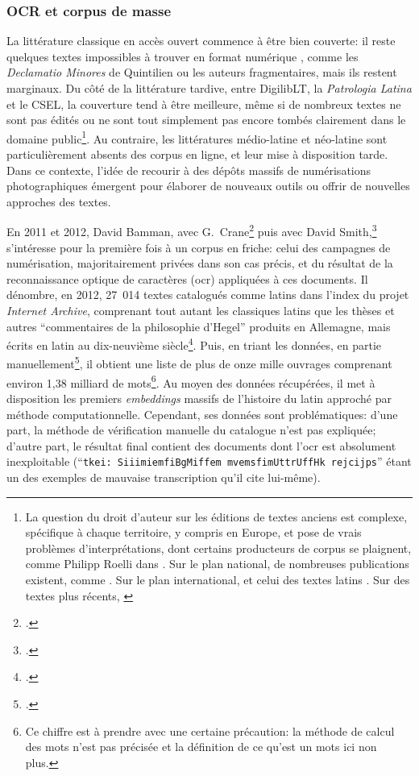 \subsubsection{OCR et corpus de masse}

La littérature classique en accès ouvert commence à être bien couverte: il reste quelques textes impossibles à trouver en format numérique , comme les \textit{Declamatio Minores} de Quintilien ou les auteurs fragmentaires, mais ils restent marginaux. Du côté de la littérature tardive, entre DigilibLT, la \textit{Patrologia Latina} et le CSEL, la couverture tend à être meilleure, même si de nombreux textes ne sont pas édités ou ne sont tout simplement pas encore tombés clairement dans le domaine public\footnote{La question du droit d'auteur sur les éditions de textes anciens est complexe, spécifique à chaque territoire, y compris en Europe, et pose de vrais problèmes d'interprétations, dont certains producteurs de corpus se plaignent, comme Philipp Roelli dans \cite{roelli2014corpus}. Sur le plan national, de nombreuses publications existent, comme \cite{combalbert_lediteur_2015, demonet_confiscation_2018}. Sur le plan international, et celui des textes latins \cite{fischer2017digital, dillen_digital_2016}. Sur des textes plus récents, \cite{dusollier_international_2019}}. Au contraire, les littératures médio-latine et néo-latine sont particulièrement absents des corpus en ligne, et leur mise à disposition tarde. Dans ce contexte, l'idée de recourir à des dépôts massifs de numérisations photographiques émergent pour élaborer de nouveaux outils ou offrir de nouvelles approches des textes.

En 2011 et 2012, David Bamman, avec G.~Crane\footcite{Bamman:2011:MHW:1998076.1998078} puis avec David Smith,\footcite{bamman_extracting_2012} s'intéresse pour la première fois à un corpus en friche: celui des campagnes de numérisation, majoritairement privées dans son cas précis, et du résultat de la reconnaissance optique de caractères (\acrshort{ocr}) appliquées à ces documents. Il dénombre, en 2012, 27~014 textes catalogués comme latins dans l'index du projet \textit{Internet Archive}, comprenant tout autant les classiques latins que les thèses et autres ``commentaires de la philosophie d'Hegel'' produits en Allemagne, mais écrits en latin au dix-neuvième siècle\footcite{bamman_extracting_2012}. Puis, en triant les données, en partie manuellement\footcite{bamman_dbammanlatintexts_2018}, il obtient une liste de plus de onze mille ouvrages comprenant environ 1,38 milliard de mots\footnote{Ce chiffre est à prendre avec une certaine précaution: la méthode de calcul des mots n'est pas précisée et la définition de ce qu'est un mots ici non plus.}. Au moyen des données récupérées, il met à disposition les premiers \textit{embeddings} massifs de l'histoire du latin approché par méthode computationnelle. Cependant, ses données sont problématiques: d'une part, la méthode de vérification manuelle du catalogue n'est pas expliquée; d'autre part, le résultat final contient des documents dont l'\acrshort{ocr} est absolument inexploitable (``\texttt{tkei: SiiimiemfiBgMiffem mvemsfimUttrUffHk rejcijps}'' étant un des exemples de mauvaise transcription qu'il cite lui-même).

